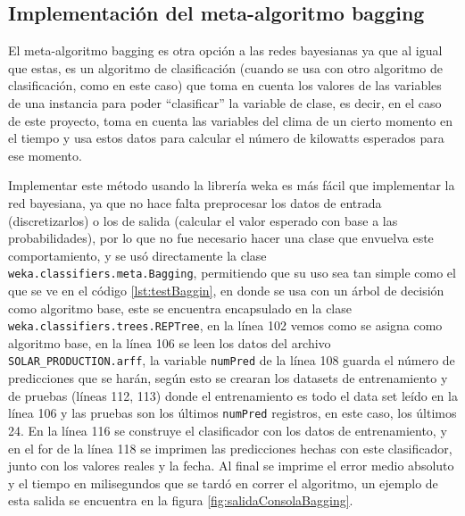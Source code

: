 \subsection{Implementación del meta-algoritmo bagging}
El meta-algoritmo bagging es otra opción a las redes bayesianas ya que al igual que estas, es un algoritmo de clasificación (cuando se usa con otro algoritmo de clasificación, como en este caso) que toma en cuenta los valores de las variables de una instancia para poder ``clasificar'' la variable de clase, es decir, en el caso de este proyecto, toma en cuenta las variables del clima de un cierto momento en el tiempo y usa estos datos para calcular el número de kilowatts esperados para ese momento.

Implementar este método usando la librería weka es más fácil que implementar la red bayesiana, ya que no hace falta preprocesar los datos de entrada (discretizarlos) o los de salida (calcular el valor esperado con base a las probabilidades), por lo que no fue necesario hacer una clase que envuelva este comportamiento, y se usó directamente la clase \texttt{weka.classifiers.meta.Bagging}, permitiendo que su uso sea tan simple como el que se ve en el código \ref{lst:testBaggin}, 
en donde se usa con un árbol de decisión como algoritmo base, este se encuentra encapsulado en la clase \texttt{weka.classifiers.trees.REPTree}, en la línea 102 vemos como se asigna como algoritmo base, en la línea 106 se leen los datos del archivo \texttt{SOLAR\_PRODUCTION.arff}, 
la variable \texttt{numPred} de la línea 108 guarda el número de predicciones que se harán, según esto se crearan los datasets de entrenamiento y de pruebas (líneas 112, 113) donde el entrenamiento es todo el data set leído en la línea 106 y las pruebas son los últimos \texttt{numPred} registros, en este caso, los últimos 24. 
En la línea 116 se construye el clasificador con los datos de entrenamiento, y en el for de la línea 118 se imprimen las predicciones hechas con este clasificador, junto con los valores reales y la fecha.
Al final se imprime el error medio absoluto y el tiempo en milisegundos que se tardó en correr el algoritmo, un ejemplo de esta salida se encuentra en la figura \ref{fig:salidaConsolaBagging}.


